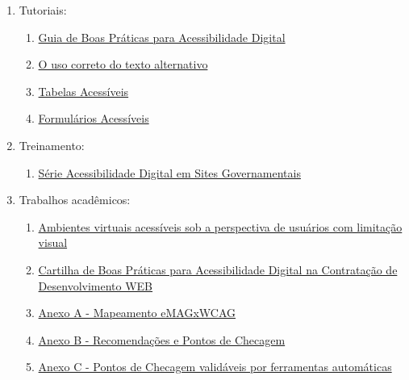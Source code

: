 \documentclass[
  12pt,
  openright,
  twoside,
  a4paper,
  english,
  french,
  spanish,
  brazil
]{abntex2}
\begin{document}
\begin{enumerate}
  \item Tutoriais:
  \begin{enumerate}
    \item
      \href{
        https://ceweb.br/projetos/bruk/guia-html
      }{Guia de Boas Práticas para Acessibilidade Digital}
    \item
      \href{
        https://www.gov.br/governodigital/pt-br/acessibilidade-e-usuario/acessibilidade-digital/uso-correto-texto-alternativo.pdf
      }{O uso correto do texto alternativo}
    \item
      \href{
        https://www.gov.br/governodigital/pt-br/acessibilidade-e-usuario/acessibilidade-digital/tabelas-acessiveis.pdf
      }{Tabelas Acessíveis}
    \item
      \href{
        https://www.gov.br/governodigital/pt-br/acessibilidade-e-usuario/acessibilidade-digital/formularios-acessiveis.pdf
      }{Formulários Acessíveis}
  \end{enumerate}
  \item Treinamento:
  \begin{enumerate}
    \item
      \href{
        https://youtube.com/playlist?list=PLCDO8oMmhbxsnmsd-ltmqB3GKWt6p1ZTs&si=OmT7LoUHGHUxO8dL
      }{Série Acessibilidade Digital em Sites Governamentais}
  \end{enumerate}
  \item Trabalhos acadêmicos:
  \begin{enumerate}
    \item
      \href{
        https://www.gov.br/governodigital/pt-br/acessibilidade-e-usuario/acessibilidade-digital/ambientes-virtuais-acessiveis-usuarios-limitacao-visual.pdf
      }{
        Ambientes virtuais acessíveis sob a perspectiva de usuários com
        limitação visual
      }
    \item \href{http://emag.governoeletronico.gov.br/cartilha-contratacao}{Cartilha de Boas Práticas para Acessibilidade Digital na Contratação de Desenvolvimento WEB}
    \item \href{https://www.gov.br/governodigital/pt-br/acessibilidade-e-usuario/acessibilidade-digital/Cartilhaversao1.0.pdf}{Anexo A - Mapeamento eMAGxWCAG}
    \item \href{https://www.gov.br/governodigital/pt-br/acessibilidade-e-usuario/acessibilidade-digital/AnexoBRecomendacoesePontosdeChecagem.ods}{Anexo B - Recomendações e Pontos de Checagem}
    \item \href{https://www.gov.br/governodigital/pt-br/acessibilidade-e-usuario/acessibilidade-digital/AnexoCPontosdeChecagemvalidaveisporferramentasautomaticas.ods}{Anexo C - Pontos de Checagem validáveis por ferramentas automáticas}

\end{enumerate}
\end{enumerate}
\end{document}
